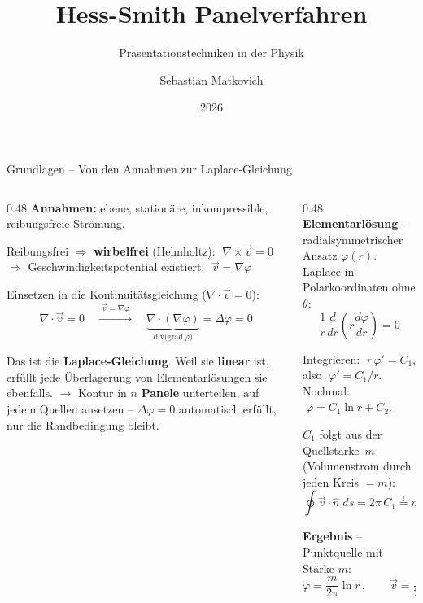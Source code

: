 \documentclass[aspectratio=169]{beamer}
\title{Hess-Smith Panelverfahren}
\subtitle{Präsentationstechniken in der Physik}
\author{Sebastian Matkovich}
\institute{TU Wien}
\date{2026}
\begin{document}
\begin{frame}
  \titlepage
\end{frame}

\begin{frame}{Grundlagen -- Von den Annahmen zur Laplace-Gleichung}
\footnotesize

\begin{columns}[T]
\begin{column}{0.48\textwidth}
\textbf{Annahmen:} ebene, stationäre, inkompressible, reibungsfreie Strömung.

\smallskip
Reibungsfrei $\Rightarrow$ \textbf{wirbelfrei} (Helmholtz):
$\;\nabla\times\vec{v}=0$
\;\;$\Rightarrow$ Geschwindigkeitspotential existiert:
$\;\vec{v} = \nabla\varphi$

Einsetzen in die Kontinuitätsgleichung ($\nabla\cdot\vec{v}=0$):
\vspace{-2mm}
\[
  \nabla\cdot\vec{v} = 0
  \quad\xrightarrow{\;\vec{v}=\nabla\varphi\;}
  \quad\underbrace{\nabla\cdot(\nabla\varphi)}_{\text{div(grad}\,\varphi)} = \Delta\varphi = 0
\]

\vspace{-3mm}
Das ist die \textbf{Laplace-Gleichung}.
Weil sie \textbf{linear} ist, erfüllt jede Überlagerung
von Elementarlösungen sie ebenfalls.
$\to$ Kontur in $n$ \textbf{Panele} unterteilen, auf jedem
Quellen ansetzen -- $\Delta\varphi=0$ automatisch
erfüllt, nur die Randbedingung bleibt.
\end{column}
\begin{column}{0.48\textwidth}
\textbf{Elementarlösung} -- radialsymmetrischer Ansatz
$\varphi(r)$. Laplace in Polarkoordinaten ohne $\theta$:
\vspace{-1mm}
\[
  \frac{1}{r}\frac{d}{dr}\!\left(r\frac{d\varphi}{dr}\right) = 0
\]

\vspace{-2mm}
Integrieren: $\;r\,\varphi' = C_1$, also $\;\varphi' = C_1/r$.
Nochmal: $\;\varphi = C_1 \ln r + C_2$.

\smallskip
$C_1$ folgt aus der Quellstärke~$m$
(Volumenstrom durch jeden Kreis $= m$):
\vspace{-1mm}
\[
  \oint \vec{v}\!\cdot\!\hat{n}\;ds = 2\pi\, C_1 \stackrel{!}{=} m
  \;\;\Rightarrow\;\;
  C_1 = \tfrac{m}{2\pi}
\]

\vspace{-2mm}
\textbf{Ergebnis} -- Punktquelle mit Stärke $m$:
\vspace{-1mm}
\[
  \boxed{\varphi = \frac{m}{2\pi}\ln r\,,
  \qquad
  \vec{v} = \frac{m}{2\pi r}\,\hat{e}_r}
\]
\end{column}
\end{columns}

\end{frame}
\end{document}
